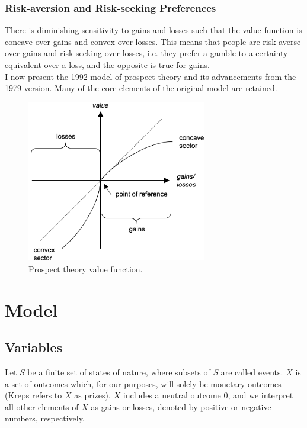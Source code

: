 \documentclass[a4paper,12pt]{article}
\numberwithin{equation}{section}
\theoremstyle{definition}
\begin{document}
\subsubsection{Risk-aversion and Risk-seeking Preferences}
	There is diminishing sensitivity to gains and losses such that the value function is concave over gains and convex over losses. This means that people are risk-averse over gains and risk-seeking over losses, i.e. they prefer a gamble to a certainty equivalent over a loss, and the opposite is true for gains.
\\

I now present the 1992 model of prospect theory and its advancements from the 1979 version. Many of the core elements of the original model are retained.

\begin{figure}
\centering
\includegraphics[width=0.7\textwidth]{prospect_theory.png}
\caption{\label{fig:valuefunction} Prospect theory value function.}
\end{figure}

\section{Model}
\subsection{Variables}
\indent  Let $S$ be a finite set of states of nature, where subsets of $S$ are called events. $X$ is a set of outcomes which, for our purposes, will solely be monetary outcomes (Kreps refers to $X$ as prizes). $X$ includes a neutral outcome 0, and we interpret all other elements of $X$ as gains or losses, denoted by positive or negative numbers, respectively.
\\
\end{document}
